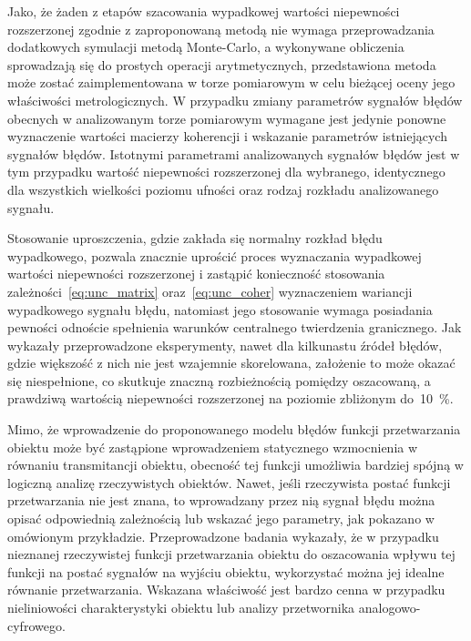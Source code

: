 Jako, że żaden z etapów szacowania wypadkowej wartości niepewności rozszerzonej zgodnie z zaproponowaną metodą nie wymaga przeprowadzania dodatkowych symulacji metodą Monte-Carlo, a wykonywane obliczenia sprowadzają się do prostych operacji arytmetycznych, przedstawiona metoda może zostać zaimplementowana w torze pomiarowym w celu bieżącej oceny jego właściwości metrologicznych. W przypadku zmiany parametrów sygnałów błędów obecnych w analizowanym torze pomiarowym wymagane jest jedynie ponowne wyznaczenie wartości macierzy koherencji i wskazanie parametrów istniejących sygnałów błędów. Istotnymi parametrami analizowanych sygnałów błędów jest w tym przypadku wartość niepewności rozszerzonej dla wybranego, identycznego dla wszystkich wielkości poziomu ufności oraz rodzaj rozkładu analizowanego sygnału.

Stosowanie uproszczenia, gdzie zakłada się normalny rozkład błędu wypadkowego, pozwala znacznie uprościć proces wyznaczania wypadkowej wartości niepewności rozszerzonej i zastąpić konieczność stosowania zależności~\eqref{eq:unc_matrix} oraz~\eqref{eq:unc_coher} wyznaczeniem wariancji wypadkowego sygnału błędu, natomiast jego stosowanie wymaga posiadania pewności odnoście spełnienia warunków centralnego twierdzenia granicznego. Jak wykazały przeprowadzone eksperymenty, nawet dla kilkunastu źródeł błędów, gdzie większość z nich nie jest wzajemnie skorelowana, założenie to może okazać się niespełnione, co skutkuje znaczną rozbieżnością pomiędzy oszacowaną, a prawdziwą wartością niepewności rozszerzonej na poziomie zbliżonym do~\qty{10}{\percent}.

Mimo, że wprowadzenie do proponowanego modelu błędów funkcji przetwarzania obiektu może być zastąpione wprowadzeniem statycznego wzmocnienia w równaniu transmitancji obiektu, obecność tej funkcji umożliwia bardziej spójną w logiczną analizę rzeczywistych obiektów. Nawet, jeśli rzeczywista postać funkcji przetwarzania nie jest znana, to wprowadzany przez nią sygnał błędu można opisać odpowiednią zależnością lub wskazać jego parametry, jak pokazano w omówionym przykładzie. Przeprowadzone badania wykazały, że w przypadku nieznanej rzeczywistej funkcji przetwarzania obiektu do oszacowania wpływu tej funkcji na postać sygnałów na wyjściu obiektu, wykorzystać można jej idealne równanie przetwarzania. Wskazana właściwość jest bardzo cenna w przypadku nieliniowości charakterystyki obiektu lub analizy przetwornika analogowo-cyfrowego.
